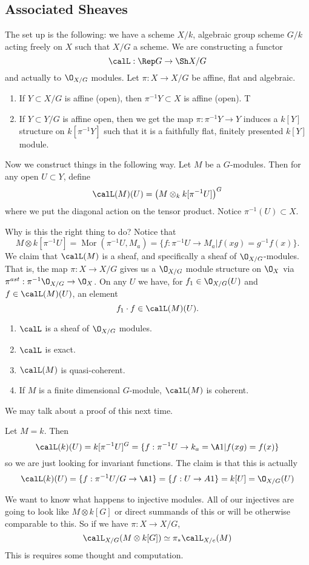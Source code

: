 \documentclass[12pt]{article}
\begin{document}
\subsection{Associated Sheaves}
The set up is the following: we have a scheme $X/k$, algebraic group scheme $G/k$ acting freely on $X$ such that $X/G$ a scheme.
We are constructing a functor 
\[\calL:\Rep G\to \Sh X/G\]
and actually to $\O_{X/G}$ modules. Let $\pi:X\to X/G$ be affine, flat and algebraic.
\begin{thm}
	\begin{enumerate}
		\item If $Y\subset X/G$ is affine (open), then $\pi^{-1}Y\subset X$ is affine (open). T
		\item If $Y\subset Y/G$ is affine open, then we get the map $\pi:\pi^{-1}Y\to Y$ induces a $k[Y]$ structure on $k[\pi^{-1}Y]$ such that it is a faithfully flat, finitely presented $k[Y]$ module.
	\end{enumerate}
\end{thm}

Now we construct things in the following way. Let $M$ be a $G$-modules. Then for any open $U\subset Y$, define 
\[\calL(M)(U)=\left(M\otimes_k k[\pi^{-1}U]\right)^G\]
where we put the diagonal action on the tensor product. Notice $\pi^{-1}(U)\subset X$.

Why is this the right thing to do? Notice that 
\[M\otimes k[\pi^{-1}U]=\operatorname{Mor}(\pi^{-1}U,M_a)=\{f:\pi^{-1}U\to M_a|f(xg)=g^{-1}f(x)\}.\]
We claim that $\calL(M)$ is a sheaf, and specifically a sheaf of $\O_{X/G}$-modules. That is, the map $\pi:X\to X/G$ gives us 
a $\O_{X/G}$ module structure on $\O_X$ via $\pi^{ast}:\pi^{-1}\O_{X/G}\to \O_X$. On any $U$ we have, for 
$f_1\in \O_{X/G}(U)$ and $f\in\calL(M)(U)$, an element 
\[f_1\cdot f\in\calL(M)(U).\]

\begin{prop}
	\begin{enumerate}
		\item $\calL$ is a sheaf of $\O_{X/G}$ modules.
		\item $\calL$ is exact.
		\item $\calL(M)$ is quasi-coherent.
		\item If $M$ is a finite dimensional $G$-module, $\calL(M)$ is coherent.
	\end{enumerate}
\end{prop}
We may talk about a proof of this next time.
\begin{ex}
	Let $M=k$. Then 
	\[\calL(k)(U)=k[\pi^{-1}U]^G=\{f:\pi^{-1}U\to k_a=\A1|f(xg)=f(x)\}\]
	so we are just looking for invariant functions. The claim is that this is actually 
	\[\calL(k)(U)=\{f:\pi^{-1}U/G\to \A1\}=\{f:U\to A1\}=k[U]=\O_{X/G}(U)\]
\end{ex}
We want to know what happens to injective modules. All of our injectives are going to look like $M\otimes k[G]$ or direct summands of this or will be 
otherwise comparable to this. So if we have $\pi:X\to X/G$,
\[\calL_{X/G}(M\otimes k[G])\simeq \pi_\ast\calL_{X/e}(M)\]
This is requires some thought and computation.
\end{document}

